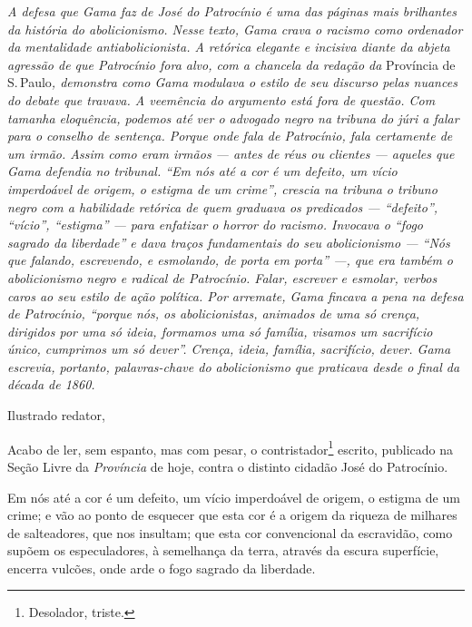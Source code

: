 {

\begin{resumo}
\emph{A defesa que Gama faz de José do Patrocínio é uma das páginas mais
brilhantes da história do abolicionismo. Nesse texto, Gama crava o
racismo como ordenador da mentalidade antiabolicionista. A retórica
elegante e incisiva diante da abjeta agressão de que Patrocínio fora
alvo, com a chancela da redação da} Província de S.\,Paulo\emph{,
demonstra como Gama modulava o estilo de seu discurso pelas nuances do
debate que travava. A veemência do argumento está fora de questão. Com
tamanha eloquência, podemos até ver o advogado negro na tribuna do
júri a falar para o conselho de sentença. Porque onde fala de
Patrocínio, fala certamente de um irmão. Assim como eram irmãos --- antes
de réus ou clientes --- aqueles que Gama defendia no tribunal. ``Em nós
até a cor é um defeito, um vício imperdoável de origem, o estigma de um
crime'', crescia na tribuna o tribuno negro com a habilidade retórica de
quem graduava os predicados --- ``defeito'', ``vício'', ``estigma'' --- para
enfatizar o horror do racismo. Invocava o ``fogo sagrado da liberdade'' e
dava traços fundamentais do seu abolicionismo --- ``Nós que falando,
escrevendo, e esmolando, de porta em porta'' ---, que era também o
abolicionismo negro e radical de Patrocínio. Falar, escrever e esmolar,
verbos caros ao seu estilo de ação política. Por arremate, Gama fincava
a pena na defesa de Patrocínio, ``porque nós, os abolicionistas, animados
de uma só crença, dirigidos por uma só ideia, formamos uma só família,
visamos um sacrifício único, cumprimos um só dever''. Crença, ideia,
família, sacrifício, dever. Gama escrevia, portanto, palavras-chave do
abolicionismo que praticava desde o final da década de 1860. }
\end{resumo}

Ilustrado redator,

Acabo de ler, sem espanto, mas com pesar, o contristador\footnote{
  Desolador, triste.} escrito, publicado na Seção Livre da
\emph{Província} de hoje, contra o distinto cidadão José do Patrocínio.

Em nós até a cor é um defeito, um vício imperdoável de origem, o estigma
de um crime; e vão ao ponto de esquecer que esta cor é a origem da
riqueza de milhares de salteadores, que nos insultam; que esta cor
convencional da escravidão, como supõem os especuladores, à semelhança
da terra, através da escura superfície, encerra vulcões, onde arde o
fogo sagrado da liberdade.

}
